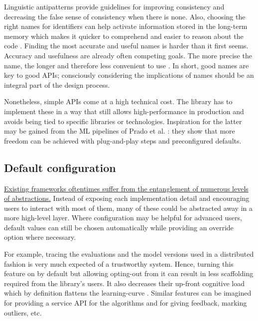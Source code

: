 Linguistic antipatterns provide guidelines for improving consistency and decreasing the false sense of consistency when there is none. Also, choosing the right names for identifiers can help activate information stored in the long-term memory which makes it quicker to comprehend and easier to reason about the code \cite{deissenboeck2006concise}. Finding the most accurate and useful names is harder than it first seems. Accuracy and usefulness are already often competing goals. The more precise the name, the longer and therefore less convenient to use \cite{butler2009relating}. In short, good names are key to good APIs; consciously considering the implications of names should be an integral part of the design process.

Nonetheless, simple APIs come at a high technical cost. The library has to implement these in a way that still allows high-performance in production \cite{kleppmann2017designing} and avoids being tied to specific libraries or technologies. Inspiration for the latter may be gained from the ML pipelines of Prado et al. \cite{prado2020bonseyes}: they show that more freedom can be achieved with plug-and-play steps and preconfigured defaults. 

\subsection{Default configuration}

\href{https://grugbrain.dev/#grug-on-apis}{Existing frameworks oftentimes suffer from the entanglement of numerous levels of abstractions.} Instead of exposing each implementation detail and encouraging users to interact with most of them, many of these could be abstracted away in a more high-level layer. Where configuration may be helpful for advanced users, default values can still be chosen automatically while providing an override option where necessary.

For example, tracing the evaluations and the model versions used in a distributed fashion is very much expected of a trustworthy system. Hence, turning this feature on by default but allowing opting-out from it can result in less scaffolding required from the library's users. It also decreases their up-front cognitive load which by definition flattens the learning-curve \cite{hermans2021programmer}. Similar features can be imagined for providing a service API for the algorithms and for giving feedback, marking outliers, etc.

